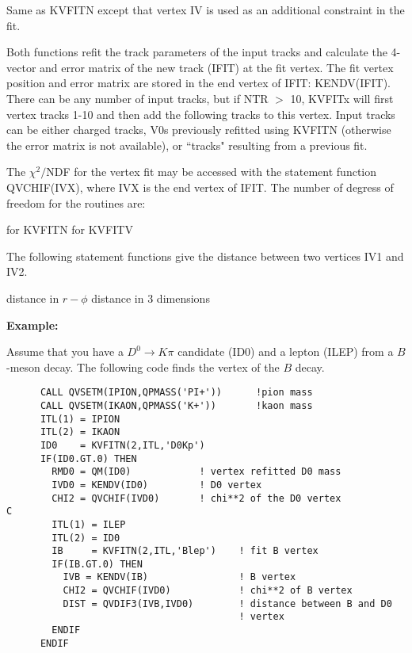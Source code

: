 \noindent{}
\par
\noindent Same as KVFITN except that vertex IV is used as an additional
constraint in the fit.
 
Both functions refit the track parameters of the input tracks and
calculate the 4-vector and error matrix of the new track (IFIT) at
the fit vertex.
The fit vertex position and error matrix are stored in the end vertex
of IFIT:  KENDV(IFIT).
There can be any number of input tracks, but if NTR $>$ 10, KVFITx
will first vertex tracks 1-10 and then add the following tracks to this
vertex. Input tracks can be either charged tracks, V0s previously refitted using KVFITN (otherwise the error matrix is not
available), 
 or ``tracks" resulting
from a previous fit.
 
The $\chi^2/$NDF for the vertex fit may be accessed with the statement
function QVCHIF(IVX), where IVX is the end vertex of IFIT. The number
of degress of freedom for the routines are:
\begin{indentlist}{ 2.50cm}{ 2.75cm}
 for KVFITN
 for KVFITV
\end{indentlist}
 
The following statement functions give the distance between two
vertices IV1 and IV2.
\begin{indentlist}{ 2.50cm}{ 2.75cm}
 distance in $r-\phi$
 distance in 3 dimensions
\end{indentlist}
 
{\bf Example:}
 
Assume that you have a $D^0 \to K \pi$ candidate (ID0) and a lepton
(ILEP) from a $B$-meson decay.  The following code finds
the vertex of the $B$ decay.
 
\begin{verbatim}
      CALL QVSETM(IPION,QPMASS('PI+'))      !pion mass
      CALL QVSETM(IKAON,QPMASS('K+'))       !kaon mass
      ITL(1) = IPION
      ITL(2) = IKAON
      ID0    = KVFITN(2,ITL,'D0Kp')
      IF(ID0.GT.0) THEN
        RMD0 = QM(ID0)            ! vertex refitted D0 mass
        IVD0 = KENDV(ID0)         ! D0 vertex
        CHI2 = QVCHIF(IVD0)       ! chi**2 of the D0 vertex
C
        ITL(1) = ILEP
        ITL(2) = ID0
        IB     = KVFITN(2,ITL,'Blep')    ! fit B vertex
        IF(IB.GT.0) THEN
          IVB = KENDV(IB)                ! B vertex
          CHI2 = QVCHIF(IVD0)            ! chi**2 of B vertex
          DIST = QVDIF3(IVB,IVD0)        ! distance between B and D0
                                         ! vertex
        ENDIF
      ENDIF
\end{verbatim}
 
